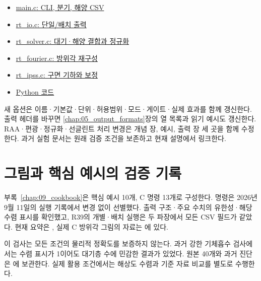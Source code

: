 \begin{itemize}
\item \href{https://github.com/brtnt/OCRT/blob/54861c68e35ec5aaa3938fad53e93dc2dfa7eb1d/code/OCRT_C/src/main.c}{main.c: CLI, 분기, 해양 CSV}
\item \href{https://github.com/brtnt/OCRT/blob/54861c68e35ec5aaa3938fad53e93dc2dfa7eb1d/code/OCRT_C/src/rt_io.c}{rt\_io.c: 단일/배치 출력}
\item \href{https://github.com/brtnt/OCRT/blob/54861c68e35ec5aaa3938fad53e93dc2dfa7eb1d/code/OCRT_C/src/rt_solver.c}{rt\_solver.c: 대기·해양 결합과 정규화}
\item \href{https://github.com/brtnt/OCRT/blob/54861c68e35ec5aaa3938fad53e93dc2dfa7eb1d/code/OCRT_C/src/rt_fourier.c}{rt\_fourier.c: 방위각 재구성}
\item \href{https://github.com/brtnt/OCRT/blob/54861c68e35ec5aaa3938fad53e93dc2dfa7eb1d/code/OCRT_C/src/rt_ipss.c}{rt\_ipss.c: 구면 기하와 보정}
\item \href{https://github.com/brtnt/OCRT/tree/54861c68e35ec5aaa3938fad53e93dc2dfa7eb1d/code/OCRT_Python}{Python 코드}
\end{itemize}

새 옵션은 이름·기본값·단위·허용범위·모드·게이트·실제 효과를 함께 갱신한다. 출력 헤더를 바꾸면 \ref{chap:05_output_formats}장의 열 목록과 읽기 예시도 갱신한다. RAA·편광·정규화·선글린트 처리 변경은 개념 장, 예시, 출력 장 세 곳을 함께 수정한다. 과거 실험 문서는 원래 검증 조건을 보존하고 현재 설명에서 링크한다.

\section{그림과 핵심 예시의 검증 기록}
\label{sec:auto:07_validation_notes:6}
부록~\ref{chap:09_cookbook}은 핵심 예시 10개, C 명령 13개로 구성한다. 명령은 2026년 9월 11일의 실행 기록에서 변경 없이 선별했다. 출력 구조·주요 수치의 유한성·해당 수렴 표시를 확인했고, R39의 개별·배치 실행은 두 파장에서 모든 CSV 필드가 같았다. 현재 요약은 , 실제 C 방위각 그림의 자료는 에 있다.

이 검사는 모든 조건의 물리적 정확도를 보증하지 않는다. 과거 강한 기체흡수 검사에서는 수렴 표시가 1이어도 대기층 수에 민감한 결과가 있었다. 원본 40개와 과거 진단은 에 보관한다. 실제 활용 조건에서는 해상도 수렴과 기준 자료 비교를 별도로 수행한다.
\par\endgroup
